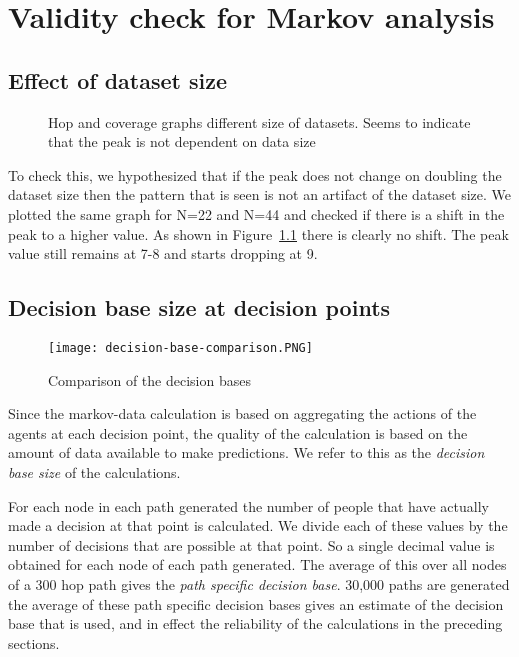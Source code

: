 
\chapter{Validity check for Markov analysis}

\section{Effect of dataset size} %
\label{sec:effect_of_dataset_size}
\begin{figure}[!t]
  \centering

  \caption{Hop and coverage graphs different size of datasets. Seems to indicate that the peak is not dependent on data size}
  \label{fig:hop_and_coverage_for_different_n}
\end{figure}




To check this, we hypothesized that if the peak does not change on doubling the dataset size then the pattern that is seen is not an artifact of the dataset size. We plotted the same graph for N=22 and N=44 and checked if there is a shift in the peak to a higher value. As shown in Figure~\ref{fig:hop_and_coverage_for_different_n} there is clearly no shift. The peak value still remains at 7-8 and starts dropping at 9.

\section{Decision base size at decision points} %
\label{sec:decision_base_size_at_decision_points}

\begin{figure}[tb]
    \begin{center}
        \texttt{[image: decision-base-comparison.PNG]}
    \end{center}
    \caption{Comparison of the decision bases}
    \label{fig:decision_base_comparison}
\end{figure}

Since the markov-data calculation is based on aggregating the actions of the agents at each decision point, the quality of the calculation is based on the amount of data available to make predictions. We refer to this as the \emph{decision base size} of the calculations.

For each node in each path generated the number of people that have actually made a decision at that point is calculated. We divide each of these values by the number of decisions that are possible at that point. So a single decimal value is obtained for each node of each path generated. The average of this over all nodes of a 300 hop path gives the \emph{path specific decision base}. 30,000 paths are generated the average of these path specific decision bases  gives an estimate of the decision base that is used, and in effect the reliability of the calculations in the preceding sections.

